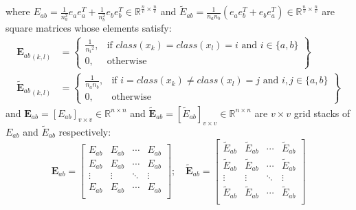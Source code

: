 \begin{appendix}
    where $E_{ab} = \frac{1}{n_a^2}e_a e_a^T + \frac{1}{n_b^2}e_b e_b^T \in \mathbb{R}^{\frac{n}{v}\times \frac{n}{v}}$ and $\tilde{E}_{ab} = \frac{1}{n_a n_b}\left(e_a e_b^T + e_b e_a^T\right) \in \mathbb{R}^{\frac{n}{v}\times \frac{n}{v}}$ are square matrices whose elements satisfy:
    \begin{align}
        {\boldsymbol{E}_{ab}}_{(k,l)} &= \left\{\begin{array}{lr}
            \frac{1}{{n_i}^2}, & \text{if } class(x_k) = class(x_l) = i \text{ and } i \in \{a, b\} \\
            0, & \text{otherwise}
            \end{array}\right\} \\
        {\boldsymbol{\tilde{E}}_{ab}}_{(k,l)} &= \left\{\begin{array}{lr}
            \frac{1}{n_a n_b}, & \text{if } i = class(x_k) \neq class(x_l) = j \text{ and } i,j \in \{a, b\} \\
            0, & \text{otherwise}
            \end{array}\right\}
    \end{align}
    and $\boldsymbol{E}_{ab} = \left[E_{ab}\right]_{v \times v} \in \mathbb{R}^{n\times n}$ and $\boldsymbol{\tilde{E}}_{ab} = \left[\tilde{E}_{ab}\right]_{v \times v} \in \mathbb{R}^{n\times n}$ are $v \times v$ grid stacks of $E_{ab}$ and $\tilde{E}_{ab}$ respectively:
    \begin{equation}
        \boldsymbol{E}_{ab} = \left[\begin{matrix}E_{ab}&E_{ab}&\cdots&E_{ab}\\E_{ab}&E_{ab}&\cdots&E_{ab}\\\vdots&\vdots&\ddots&\vdots\\E_{ab}&E_{ab}&\cdots&E_{ab}\\\end{matrix}\right]; \quad
        \boldsymbol{\tilde{E}}_{ab} = \left[\begin{matrix}\tilde{E}_{ab}&\tilde{E}_{ab}&\cdots&\tilde{E}_{ab}\\\tilde{E}_{ab}&\tilde{E}_{ab}&\cdots&\tilde{E}_{ab}\\\vdots&\vdots&\ddots&\vdots\\\tilde{E}_{ab}&\tilde{E}_{ab}&\cdots&\tilde{E}_{ab}\\\end{matrix}\right]
    \end{equation}

\normalsize
\end{appendix}
